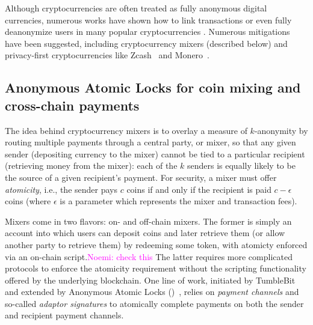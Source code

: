 \documentclass{article}
\newcommand{\noemi}[1]{\textcolor{magenta}{Noemi: #1}}
\begin{document}

Although cryptocurrencies are often treated as fully anonymous digital currencies, numerous works have shown how to link transactions or even fully deanonymize users in many popular cryptocurrencies \cite{CCS:BirKhoPus14,EuroSP:BirTik19,FC:KosKosMcD14,PoPETS:MSHLHSHHMNC18,USENIX:KYMM18}. Numerous mitigations have been suggested, including cryptocurrency mixers (described below) and privacy-first cryptocurrencies like Zcash~\cite{zcash} and Monero~\cite{monero}. 


\subsection{Anonymous Atomic Locks for coin mixing and cross-chain payments}

The idea behind cryptocurrency mixers is to overlay a measure of $k$-anonymity by routing multiple payments through a central party, or mixer, so that any given sender (depositing currency to the mixer) cannot be tied to a particular recipient (retrieving money from the mixer): each of the $k$ senders is equally likely to be the source of a given recipient's payment. For security, a mixer must offer \emph{atomicity}, i.e., the sender pays $c$ coins if and only if the recipient is paid $c-\epsilon$ coins (where $\epsilon$ is a parameter which represents the mixer and transaction fees).

Mixers come in two flavors: on- and off-chain mixers. The former is simply an account into which users can deposit coins and later retrieve them (or allow another party to retrieve them) by redeeming some token, with atomicty enforced via an on-chain script.\noemi{check this} The latter requires more complicated protocols to enforce the atomicity requirement without the scripting functionality offered by the underlying blockchain. One line of work, initiated by TumbleBit~\cite{NDSS:HABSG17} and extended by Anonymous Atomic Locks (\AAL)~\cite{SP:TaiMorMaf21}, relies on \emph{payment channels} and so-called \emph{adaptor signatures} to atomically complete payments on both the sender and recipient payment channels.
\end{document}
